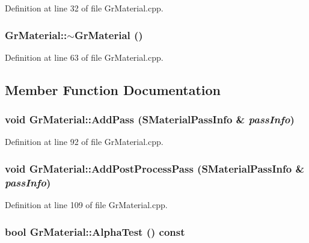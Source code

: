\begin{CompactItemize}
Definition at line 32 of file GrMaterial.cpp.\hypertarget{class_gr_material_ee72e9c9a2cff2ecb9d7db20a415e10b}{
\subsubsection[{$\sim$GrMaterial}]{\setlength{\rightskip}{0pt plus 5cm}GrMaterial::$\sim$GrMaterial ()}}
\label{class_gr_material_ee72e9c9a2cff2ecb9d7db20a415e10b}




Definition at line 63 of file GrMaterial.cpp.

\subsection{Member Function Documentation}
\hypertarget{class_gr_material_1e2106f701778cdda09a4f9d2618d664}{
\subsubsection[{AddPass}]{\setlength{\rightskip}{0pt plus 5cm}void GrMaterial::AddPass ({\bf SMaterialPassInfo} \& {\em passInfo})}}
\label{class_gr_material_1e2106f701778cdda09a4f9d2618d664}




Definition at line 92 of file GrMaterial.cpp.\hypertarget{class_gr_material_694068e7681feea901fe455e15008f6b}{
\subsubsection[{AddPostProcessPass}]{\setlength{\rightskip}{0pt plus 5cm}void GrMaterial::AddPostProcessPass ({\bf SMaterialPassInfo} \& {\em passInfo})}}
\label{class_gr_material_694068e7681feea901fe455e15008f6b}




Definition at line 109 of file GrMaterial.cpp.\hypertarget{class_gr_material_25a173f7ea53817987aca0ff8924112a}{
\subsubsection[{AlphaTest}]{\setlength{\rightskip}{0pt plus 5cm}bool GrMaterial::AlphaTest () const}}
\label{class_gr_material_25a173f7ea53817987aca0ff8924112a}





\end{CompactItemize}
